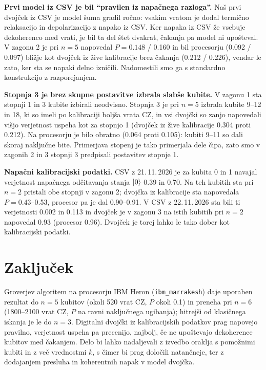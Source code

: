 \textbf{Prvi model iz CSV je bil \enquote{pravilen iz napačnega razloga}.} Naš prvi dvojček iz CSV je model šuma gradil ročno: vsakim vratom je dodal termično relaksacijo in depolarizacijo z napako iz CSV. Ker napaka iz CSV že vsebuje dekoherenco med vrati, je bil ta del štet dvakrat, čakanja pa model ni upošteval. V zagonu 2 je pri $n = 5$ napovedal $P = \num{0,148}$ / \num{0,160} in bil procesorju (\num{0,092} / \num{0,097}) bližje kot dvojček iz žive kalibracije brez čakanja (\num{0,212} / \num{0,226}), vendar le zato, ker sta se napaki delno izničili. Nadomestili smo ga s standardno konstrukcijo z razporejanjem.

\textbf{Stopnja 3 je brez skupne postavitve izbrala slabše kubite.} V zagonu 1 sta stopnji 1 in 3 kubite izbirali neodvisno. Stopnja 3 je pri $n = 5$ izbrala kubite 9--12 in 18, ki so imeli po kalibraciji boljša vrata CZ, in vsi dvojčki so zanjo napovedali višjo verjetnost uspeha kot za stopnjo 1 (dvojček iz žive kalibracije \num{0,304} proti \num{0,212}). Na procesorju je bilo obratno (\num{0,064} proti \num{0,105}): kubiti 9--11 so dali skoraj naključne bite. Primerjava stopenj je tako primerjala dele čipa, zato smo v zagonih 2 in 3 stopnji 3 predpisali postavitev stopnje 1.

\textbf{Napačni kalibracijski podatki.} CSV z 21.\,11.\,2026 je za kubita 0 in 1 navajal verjetnost napačnega odčitavanja stanja $\ket{0}$ \num{0,39} in \num{0,70}. Na teh kubitih sta pri $n = 2$ pristali obe stopnji v zagonu 2; dvojčka iz kalibracije sta napovedala $P = \num{0,43}$--\num{0,53}, procesor pa je dal \num{0,90}--\num{0,91}. V CSV z 22.\,11.\,2026 sta bili ti verjetnosti \num{0,002} in \num{0,113} in dvojček je v zagonu 3 na istih kubitih pri $n = 2$ napovedal \num{0,93} (procesor \num{0,96}). Dvojček je torej lahko le tako dober kot kalibracijski podatki.


\section{Zaključek}
\label{g16:sec:zakljucek}

Groverjev algoritem na procesorju IBM Heron (\texttt{ibm\_marrakesh}) daje uporaben rezultat do $n = 5$ kubitov (okoli 520 vrat CZ, $P$ okoli \num{0,1}) in preneha pri $n = 6$ (\num{1800}--\num{2100} vrat CZ, $P$ na ravni naključnega ugibanja); hitrejši od klasičnega iskanja je le do $n = 3$. Digitalni dvojčki iz kalibracijskih podatkov prag napovejo pravilno, verjetnost uspeha pa precenijo, najbolj, če ne upoštevajo dekoherence kubitov med čakanjem. Delo bi lahko nadaljevali z izvedbo oraklja s pomožnimi kubiti in z več vrednostmi $k$, s čimer bi prag določili natančneje, ter z dodajanjem presluha in koherentnih napak v model dvojčka.


